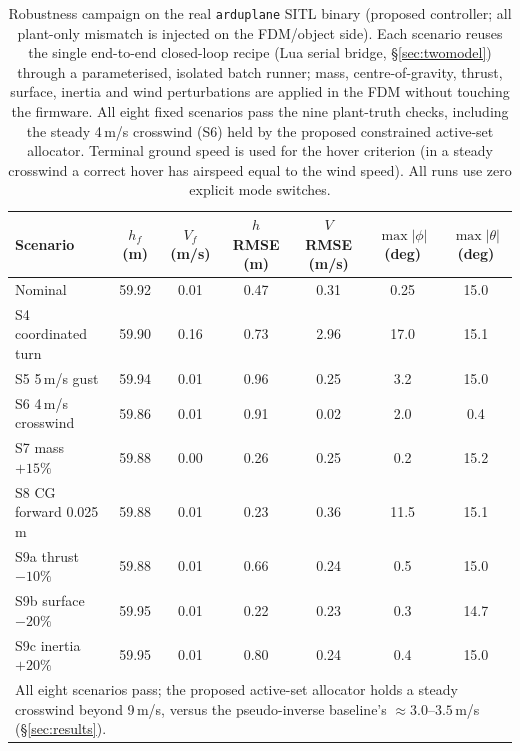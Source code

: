 \documentclass[preprint,3p,11pt]{elsarticle}
\begin{document}
\begin{table}[t]
\centering
\caption{Robustness campaign on the real \texttt{arduplane} SITL binary
(proposed controller; all plant-only mismatch is injected on the FDM/object side).
Each scenario reuses the single end-to-end closed-loop recipe (Lua serial
bridge, \S\ref{sec:twomodel}) through a parameterised, isolated batch runner;
mass, centre-of-gravity, thrust, surface, inertia and wind perturbations are
applied in the FDM without touching the firmware. All eight fixed scenarios
pass the nine plant-truth checks, including the steady 4\,m/s crosswind (S6)
held by the proposed constrained active-set allocator. Terminal ground speed
is used for the hover criterion (in a steady crosswind a correct hover has
airspeed equal to the wind speed). All runs use zero explicit mode switches.}
\label{tab:robust}
\small
\begin{tabular}{lcccccc}
\toprule
Scenario & $h_f$ (m) & $V_f$ (m/s) & $h$ RMSE (m) & $V$ RMSE (m/s) & $\max|\phi|$ (deg) & $\max|\theta|$ (deg) \\
\midrule
Nominal            & 59.92 & 0.01 & 0.47 & 0.31 & 0.25 & 15.0 \\
S4 coordinated turn & 59.90 & 0.16 & 0.73 & 2.96 & 17.0 & 15.1 \\
S5 5\,m/s gust      & 59.94 & 0.01 & 0.96 & 0.25 & 3.2 & 15.0 \\
S6 4\,m/s crosswind & 59.86 & 0.01 & 0.91 & 0.02 & 2.0 & 0.4 \\
S7 mass $+15\%$     & 59.88 & 0.00 & 0.26 & 0.25 & 0.2 & 15.2 \\
S8 CG forward 0.025\,m & 59.88 & 0.01 & 0.23 & 0.36 & 11.5 & 15.1 \\
S9a thrust $-10\%$  & 59.88 & 0.01 & 0.66 & 0.24 & 0.5 & 15.0 \\
S9b surface $-20\%$ & 59.95 & 0.01 & 0.22 & 0.23 & 0.3 & 14.7 \\
S9c inertia $+20\%$ & 59.95 & 0.01 & 0.80 & 0.24 & 0.4 & 15.0 \\
\midrule
\multicolumn{7}{l}{\footnotesize All eight scenarios pass; the proposed
active-set allocator holds a steady crosswind beyond 9\,m/s, versus the
pseudo-inverse baseline's $\approx\!3.0$--$3.5$\,m/s (\S\ref{sec:results}).}\\
\bottomrule
\end{tabular}
\end{table}
\end{document}

